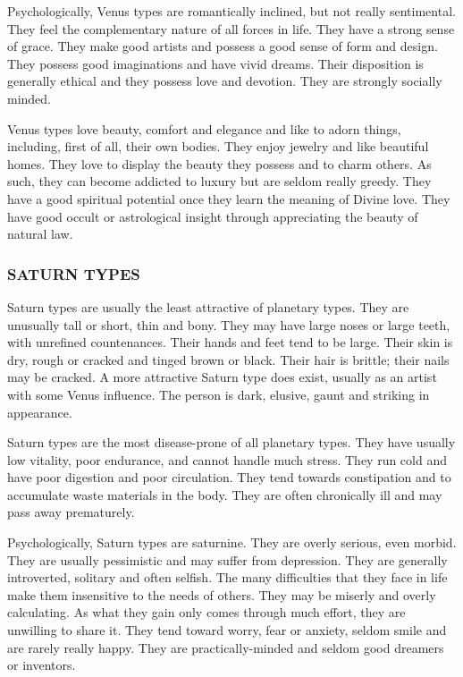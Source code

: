  

Psychologically, Venus types are romantically inclined, but not really sentimental. They feel the complementary nature of all forces in life. They have a strong sense of grace. They make good artists and possess a good sense of form and design. They possess good imaginations and have vivid dreams. Their disposition is generally ethical and they possess love and devotion. They are strongly socially minded.

 

Venus types love beauty, comfort and elegance and like to adorn things, including, first of all, their own bodies. They enjoy jewelry and like beautiful homes. They love to display the beauty they possess and to charm others. As such, they can become addicted to luxury but are seldom really greedy. They have a good spiritual potential once they learn the meaning of Divine love. They have good occult or astrological insight through appreciating the beauty of natural law.

 



\subsubsection{SATURN TYPES }
 

Saturn types are usually the least attractive of planetary types. They are unusually tall or short, thin and bony. They may have large noses or large teeth, with unrefined countenances. Their hands and feet tend to be large. Their skin is dry, rough or cracked and tinged brown or black. Their hair is brittle; their nails may be cracked. A more attractive Saturn type does exist, usually as an artist with some Venus influence. The person is dark, elusive, gaunt and striking in appearance.

 

Saturn types are the most disease-prone of all planetary types. They have usually low vitality, poor endurance, and cannot handle much stress. They run cold and have poor digestion and poor circulation. They tend towards constipation and to accumulate waste materials in the body. They are often chronically ill and may pass away prematurely.

 

Psychologically, Saturn types are saturnine. They are overly serious, even morbid. They are usually pessimistic and may suffer from depression. They are generally introverted, solitary and often selfish. The many difficulties that they face in life make them insensitive to the needs of others. They may be miserly and overly calculating. As what they gain only comes through much effort, they are unwilling to share it. They tend toward worry, fear or anxiety, seldom smile and are rarely really happy. They are practically-minded and seldom good dreamers or inventors.

